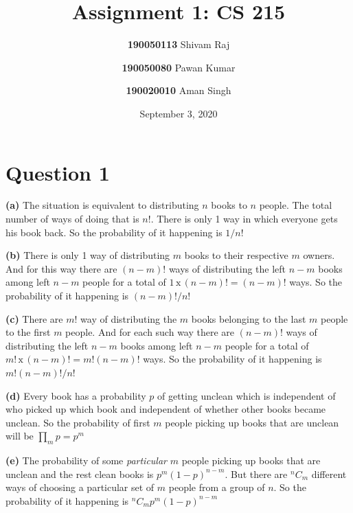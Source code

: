 \documentclass{article}
\title{Assignment 1: CS 215}
\author{
  \textbf{190050113} Shivam Raj
  \and
  \textbf{190050080} Pawan Kumar
  \and
  \textbf{190020010} Aman Singh
}
\date{September 3, 2020}
\theoremstyle{remark}
\begin{document}
\maketitle
\tableofcontents

\newpage
{}

\section{Question 1}
\textbf{(a)} The situation is equivalent to distributing $n$ books to $n$ people. The total number of ways of doing that is $n!$. There is only 1 way in which everyone gets his book back. So the probability of it happening is $\boxed{1/n!}$ \par

\textbf{(b)} There is only 1 way of distributing $m$ books to their respective $m$ owners. And for this way there are $(n-m)!$ ways of distributing the left $n-m$ books among left $n-m$ people for a total of $1\,\text{x}\,(n-m)!=(n-m)!$ ways. So the probability of it happening is $\boxed{(n-m)!/n!}$ \par

\textbf{(c)} There are $m!$ way of distributing the $m$ books belonging to the last $m$ people to the first $m$ people. And for each such way there are $(n-m)!$ ways of distributing the left $n-m$ books among left $n-m$ people for a total of $m!\,\text{x}\,(n-m)!=m!(n-m)!$ ways. So the probability of it happening is $\boxed{m!(n-m)!/n!}$ \par

\textbf{(d)} Every book has a probability $p$ of getting unclean which is independent of who picked up which book and independent of whether other books became unclean. So the probability of first $m$ people picking up books that are unclean will be $\prod_m p = \boxed{p^m}$ \par

\textbf{(e)} The probability of some \textit{particular} $m$ people picking up books that are unclean and the rest clean books is $p^m(1-p)^{n-m}$. But there are ${}^n C_m$ different ways of choosing a particular set of $m$ people from a group of $n$. So the probability of it happening is $\boxed{{}^n C_m p^m(1-p)^{n-m}}$\par
\end{document}
